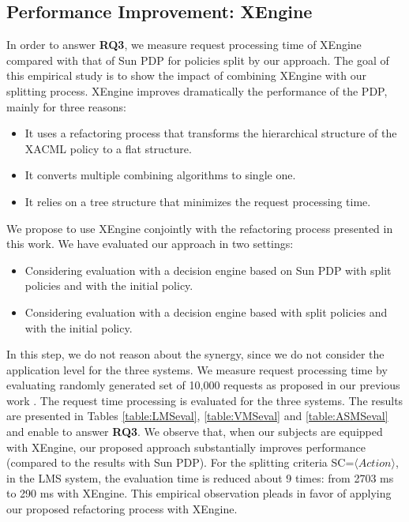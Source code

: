 \subsection{Performance Improvement: XEngine}
In order to answer \textbf{RQ3}, we measure request processing time of XEngine compared with that of Sun PDP
for policies split by our approach.
The goal of this empirical study is to show the impact of combining
XEngine with our splitting process. XEngine improves dramatically the performance of the PDP, mainly for
three reasons:
\begin{itemize}
\item It uses a refactoring process that transforms the hierarchical structure of the XACML policy to a flat structure.
\item  It converts multiple combining algorithms to single one.
\item  It relies on a tree structure that minimizes the request
processing time.
\end{itemize}
We propose to use XEngine conjointly with the refactoring
process presented in this work. We have evaluated our
approach in two settings:
\begin{itemize}
\item  Considering evaluation with a decision engine based
on Sun PDP with split policies and with the initial policy.
\item Considering evaluation with a decision engine based
with split policies and with the initial policy.
\end{itemize}

In this step, we do not reason about the synergy, since we do not consider the application level for the three systems.
We measure request processing time by evaluating randomly
generated set of 10,000 requests as proposed in our previous work \cite{request}.
The request time processing is evaluated for the three systems. The results
are presented in Tables \ref{table:LMSeval}, \ref{table:VMSeval} and \ref{table:ASMSeval} and enable to answer \textbf{RQ3}.
We observe that, when our subjects are equipped with XEngine, our proposed approach 
substantially improves performance (compared to the results with Sun PDP). For the splitting criteria SC=$\langle Action \rangle$,
in the LMS system, the evaluation time is reduced about 9 times: from 2703 ms to 290 ms with XEngine. This empirical 
observation pleads in favor of applying our proposed refactoring process with XEngine.

